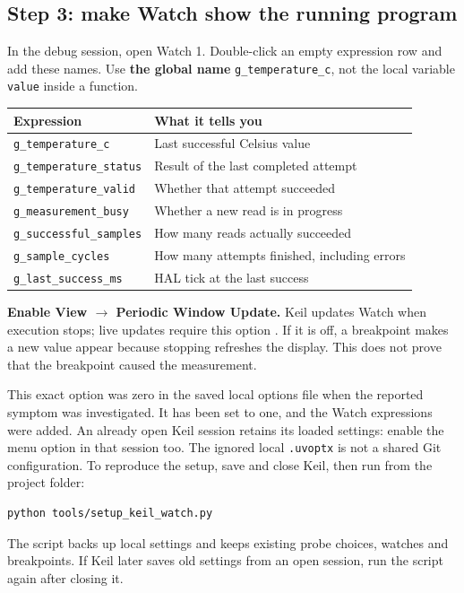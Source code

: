 \subsection{Step 3: make Watch show the running program}
In the debug session, open Watch 1. Double-click an empty expression row and add these names. Use \textbf{the global name} \texttt{g\_temperature\_c}, not the local variable \texttt{value} inside a function.
\begin{center}
\begin{tabular}{p{57mm}p{72mm}}
\toprule
Expression & What it tells you\\
\midrule
\texttt{g\_temperature\_c} & Last successful Celsius value\\
\texttt{g\_temperature\_status} & Result of the last completed attempt\\
\texttt{g\_temperature\_valid} & Whether that attempt succeeded\\
\texttt{g\_measurement\_busy} & Whether a new read is in progress\\
\texttt{g\_successful\_samples} & How many reads actually succeeded\\
\texttt{g\_sample\_cycles} & How many attempts finished, including errors\\
\texttt{g\_last\_success\_ms} & HAL tick at the last success\\
\bottomrule
\end{tabular}
\end{center}
\textbf{Enable View $\rightarrow$ Periodic Window Update.} Keil updates Watch when execution stops; live updates require this option \cite{keilwatch}. If it is off, a breakpoint makes a new value appear because stopping refreshes the display. This does not prove that the breakpoint caused the measurement.

This exact option was zero in the saved local options file when the reported symptom was investigated. It has been set to one, and the Watch expressions were added. An already open Keil session retains its loaded settings: enable the menu option in that session too. The ignored local \texttt{.uvoptx} is not a shared Git configuration. To reproduce the setup, save and close Keil, then run from the project folder:
\begin{lstlisting}[language={},numbers=none]
python tools/setup_keil_watch.py
\end{lstlisting}
The script backs up local settings and keeps existing probe choices, watches and breakpoints. If Keil later saves old settings from an open session, run the script again after closing it.

